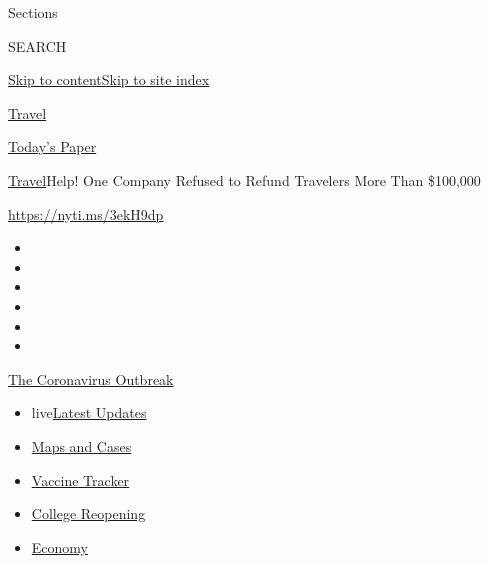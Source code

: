 Sections

SEARCH

\protect\hyperlink{site-content}{Skip to
content}\protect\hyperlink{site-index}{Skip to site index}

\href{https://www.nytimes.com/section/travel}{Travel}

\href{https://myaccount.nytimes.com/auth/login?response_type=cookie\&client_id=vi}{}

\href{https://www.nytimes.com/section/todayspaper}{Today's Paper}

\href{/section/travel}{Travel}\textbar{}Help! One Company Refused to
Refund Travelers More Than \$100,000

\url{https://nyti.ms/3ekH9dp}

\begin{itemize}
\item
\item
\item
\item
\item
\item
\end{itemize}

\href{https://www.nytimes.com/news-event/coronavirus?action=click\&pgtype=Article\&state=default\&region=TOP_BANNER\&context=storylines_menu}{The
Coronavirus Outbreak}

\begin{itemize}
\tightlist
\item
  live\href{https://www.nytimes.com/2020/08/03/world/coronavirus-covid-19.html?action=click\&pgtype=Article\&state=default\&region=TOP_BANNER\&context=storylines_menu}{Latest
  Updates}
\item
  \href{https://www.nytimes.com/interactive/2020/us/coronavirus-us-cases.html?action=click\&pgtype=Article\&state=default\&region=TOP_BANNER\&context=storylines_menu}{Maps
  and Cases}
\item
  \href{https://www.nytimes.com/interactive/2020/science/coronavirus-vaccine-tracker.html?action=click\&pgtype=Article\&state=default\&region=TOP_BANNER\&context=storylines_menu}{Vaccine
  Tracker}
\item
  \href{https://www.nytimes.com/2020/08/02/us/covid-college-reopening.html?action=click\&pgtype=Article\&state=default\&region=TOP_BANNER\&context=storylines_menu}{College
  Reopening}
\item
  \href{https://www.nytimes.com/live/2020/08/03/business/stock-market-today-coronavirus?action=click\&pgtype=Article\&state=default\&region=TOP_BANNER\&context=storylines_menu}{Economy}
\end{itemize}

